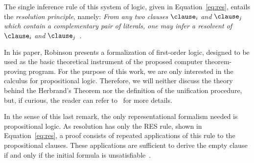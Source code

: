 The single inference rule of this system of logic, given in
Equation~\ref{eq:res}, entails the \emph{resolution principle}, namely:
\emph{From any two clauses} $\clause_i$ \emph{and} $\clause_j$ \emph{which
contain a complementary pair of literals, one may infer a resolvent of}
$\clause_i$ \emph{and} $\clause_j$~\cite{Robinson65}.   

In his paper, Robinson presents a formalization of first-order logic, designed to
be used as the basic theoretical instrument of the proposed computer
theorem-proving program. For the purpose of this work, we are only interested in
the calculus for propositional logic. Therefore, we will neither discuss the theory
behind the Herbrand's Theorem nor the definition of the unification procedure,
but, if curious, the reader can refer to~\cite{Robinson65} for more details.

In the sense of this last remark, the only representational formalism needed is
propositional logic. As resolution has only the RES rule, shown in
Equation~\ref{eq:res}, a proof consists of repeated applications of this rule to
the propositional clauses. These applications are sufficient to derive the empty
clause if and only if the initial formula is unsatisfiable~\cite{satchapter}.

